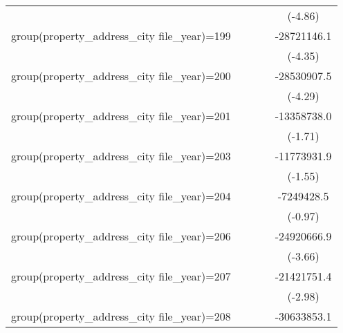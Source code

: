 {\begin{tabular}{l*{4}{c}}
                    &                     &                     &                     &     (-4.86)         \\
\addlinespace
group(property\_address\_city file\_year)=199&                     &                     &                     & -28721146.1\sym{***}\\
                    &                     &                     &                     &     (-4.35)         \\
\addlinespace
group(property\_address\_city file\_year)=200&                     &                     &                     & -28530907.5\sym{***}\\
                    &                     &                     &                     &     (-4.29)         \\
\addlinespace
group(property\_address\_city file\_year)=201&                     &                     &                     & -13358738.0         \\
                    &                     &                     &                     &     (-1.71)         \\
\addlinespace
group(property\_address\_city file\_year)=203&                     &                     &                     & -11773931.9         \\
                    &                     &                     &                     &     (-1.55)         \\
\addlinespace
group(property\_address\_city file\_year)=204&                     &                     &                     &  -7249428.5         \\
                    &                     &                     &                     &     (-0.97)         \\
\addlinespace
group(property\_address\_city file\_year)=206&                     &                     &                     & -24920666.9\sym{***}\\
                    &                     &                     &                     &     (-3.66)         \\
\addlinespace
group(property\_address\_city file\_year)=207&                     &                     &                     & -21421751.4\sym{**} \\
                    &                     &                     &                     &     (-2.98)         \\
\addlinespace
group(property\_address\_city file\_year)=208&                     &                     &                     & -30633853.1\sym{***}\\

\end{tabular}}
